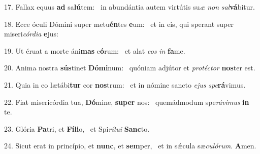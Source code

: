 17. Fallax equus \textbf{ad} sa\textbf{lú}tem: \ast\  in abundántia autem virtútis su\textit{æ} \textit{non} \textit{sal}\textbf{vá}bitur.\

18. Ecce óculi Dómini super metu\textbf{én}tes \textbf{e}um: \ast\  et in eis, qui sperant super miseri\textit{cór}\textit{di}\textit{a} \textbf{e}jus:\

19. Ut éruat a morte áni\textbf{mas} e\textbf{ó}rum: \ast\  et alat \textit{e}\textit{os} \textit{in} \textbf{fa}me.\

20. Anima nostra \textbf{sús}tinet \textbf{Dó}\textbf{mi}num: \ast\  quóniam adjútor et \textit{pro}\textit{téc}\textit{tor} \textbf{nos}ter est.\

21. Quia in eo lætábi\textbf{tur} cor \textbf{nos}trum: \ast\  et in nómine sancto \textit{e}\textit{jus} \textit{spe}\textbf{rá}vimus.\

22. Fiat misericórdia tua, \textbf{Dó}mine, \textbf{su}\textbf{per} nos: \ast\  quemádmodum spe\textit{rá}\textit{vi}\textit{mus} \textbf{in} te.\

23. Glória \textbf{Pa}tri, et \textbf{Fí}\textbf{li}o, \ast\  et Spi\textit{rí}\textit{tu}\textit{i} \textbf{Sanc}to.\

24. Sicut erat in princípio, et \textbf{nunc}, et \textbf{sem}per, \ast\  et in sǽcula sæ\textit{cu}\textit{ló}\textit{rum}. \textbf{A}men.\

